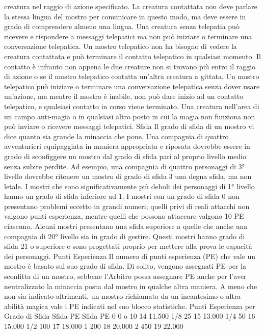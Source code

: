\begin{multicols}{2}
creatura nel raggio di azione specificato. La creatura
contattata non deve parlare la stessa lingua del mostro
per comunicare in questo modo, ma deve essere in
grado di comprendere almeno una lingua. Una creatura
senza telepatia può ricevere e rispondere a messaggi
telepatici ma non può iniziare o terminare una
conversazione telepatica.
Un mostro telepatico non ha bisogno di vedere la
creatura contattata e può terminare il contatto telepatico
in qualsiasi momento. Il contatto è infranto non appena
le due creature non si trovano più entro il raggio di
azione o se il mostro telepatico contatta un’altra
creatura a gittata. Un mostro telepatico può iniziare o
terminare una conversazione telepatica senza dover
usare un’azione, ma mentre il mostro è inabile, non può
dare inizio ad un contatto telepatico, e qualsiasi
contatto in corso viene terminato.
Una creatura nell’area di un campo anti-magia o in
qualsiasi altro posto in cui la magia non funziona non
può inviare o ricevere messaggi telepatici.
Sfida
Il grado di sfida di un mostro vi dice quanto sia grande
la minaccia che pone. Una compagnia di quattro
avventurieri equipaggiata in maniera appropriata e
riposata dovrebbe essere in grado di sconfiggere un
mostro dal grado di sfida pari al proprio livello medio
senza subire perdite. Ad esempio, una compagnia di
quattro personaggi di 3° livello dovrebbe ritenere un
mostro di grado di sfida 3 una degna sfida, ma non
letale.
I mostri che sono significativamente più deboli dei
personaggi di 1° livello hanno un grado di sfida inferiore
ad 1. I mostri con un grado di sfida 0 non presentano
problemi eccetto in grandi numeri; quelli privi di reali
attacchi non valgono punti esperienza, mentre quelli
che possono attaccare valgono 10 PE ciascuno.
Alcuni mostri presentano una sfida superiore a quelle
che anche una compagnia di 20° livello sia in grado di
gestire. Questi mostri hanno grado di sfida 21 o
superiore e sono progettati proprio per mettere alla
prova le capacità dei personaggi.
Punti Esperienza
Il numero di punti esperienza (PE) che vale un mostro è
basato sul suo grado di sfida. Di solito, vengono
assegnati PE per la sconfitta di un mostro, sebbene
l’Arbitro possa assegnare PE anche per l’aver
neutralizzato la minaccia posta dal mostro in qualche
altra maniera.
A meno che non sia indicato altrimenti, un mostro
richiamato da un incantesimo o altra abilità magica vale
i PE indicati nel suo blocco statistiche.
Punti Esperienza per Grado di Sfida
Sfida PE Sfida PE
0 0 o 10 14 11.500
1/8 25 15 13.000
1/4 50 16 15.000
1/2 100 17 18.000
1 200 18 20.000
2 450 19 22.000

\end{multicols}
